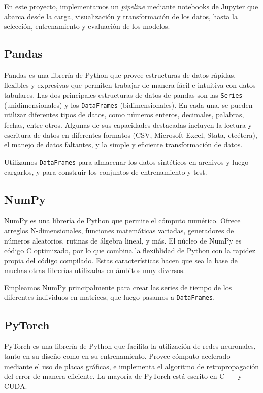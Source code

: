 \documentclass[../../main.tex]{subfiles}
\begin{document}
En este proyecto, implementamos un \textit{pipeline} mediante notebooks de Jupyter que
abarca desde la carga, visualización y transformación de los datos, hasta la selección,
entrenamiento y evaluación de los modelos.



\subsection{Pandas}
Pandas \cite{pandas-docs} es una librería de Python que provee estructuras de datos
rápidas, flexibles y expresivas que permiten trabajar de manera fácil e intuitiva con
datos tabulares. Las dos principales estructuras de datos de pandas son las
\texttt{Series} (unidimensionales) y los \texttt{DataFrames} (bidimensionales). En cada
una, se pueden utilizar diferentes tipos de datos, como números enteros, decimales,
palabras, fechas, entre otros. Algunas de sus capacidades destacadas incluyen la lectura y
escritura de datos en diferentes formatos (CSV, Microsoft Excel, Stata, etcétera), el
manejo de datos faltantes, y la simple y eficiente transformación de datos.

Utilizamos \texttt{DataFrames} para almacenar los datos sintéticos en archivos y luego
cargarlos, y para construir los conjuntos de entrenamiento y test.

\subsection{NumPy}
NumPy \cite{numpy-docs} es una librería de Python que permite el cómputo numérico. Ofrece
arreglos N-dimensionales, funciones matemáticas variadas, generadores de números
aleatorios, rutinas de álgebra lineal, y más. El núcleo de NumPy es código C optimizado,
por lo que combina la flexiblidad de Python con la rapidez propia del código compilado.
Estas características hacen que sea la base de muchas otras librerías utilizadas en
ámbitos muy diversos.

Empleamos NumPy principalmente para crear las series de tiempo de los diferentes
individuos en matrices, que luego pasamos a \texttt{DataFrames}.

\subsection{PyTorch}
PyTorch \cite{pytorch-docs} es una librería de Python que facilita la utilización de redes
neuronales, tanto en su diseño como en su entrenamiento. Provee cómputo acelerado mediante
el uso de placas gráficas, e implementa el algoritmo de retropropagación del error de
manera eficiente. La mayoría de PyTorch está escrito en C++ y CUDA.
\end{document}
